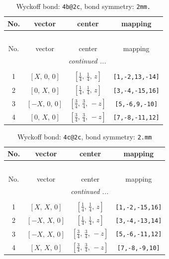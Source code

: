 \documentclass[fleqn,8pt]{jsarticle}
\begin{document}
\begin{longtable}{cccc}
\caption{Wyckoff bond: {\tt 4b@2c}, bond symmetry: {\tt 2mm.}}
 \\
 \hline \hline
No. & vector & center & mapping \\ \hline \endfirsthead

\multicolumn{3}{l}{\tablename\ \thetable{}} \\
 \hline \hline
No. & vector & center & mapping \\ \hline \endhead

 \hline \hline
\multicolumn{3}{r}{\footnotesize\it continued ...} \\ \endfoot

 \hline \hline
\multicolumn{3}{r}{} \\ \endlastfoot

1 & $\left[ X,\, 0,\, 0 \right]$ & $\left[ \frac{1}{4},\, \frac{1}{4},\, z \right]$ & {\tt [1,-2,13,-14]} \\ \hline
2 & $\left[ 0,\, X,\, 0 \right]$ & $\left[ \frac{1}{4},\, \frac{1}{4},\, z \right]$ & {\tt [3,-4,-15,16]} \\ \hline
3 & $\left[ - X,\, 0,\, 0 \right]$ & $\left[ \frac{3}{4},\, \frac{3}{4},\, - z \right]$ & {\tt [5,-6,9,-10]} \\ \hline
4 & $\left[ 0,\, X,\, 0 \right]$ & $\left[ \frac{3}{4},\, \frac{3}{4},\, - z \right]$ & {\tt [7,-8,-11,12]} \\
\end{longtable}
\renewcommand{\arraystretch}{1.2}
\begin{longtable}{cccc}
\caption{Wyckoff bond: {\tt 4c@2c}, bond symmetry: {\tt 2.mm}}
 \\
 \hline \hline
No. & vector & center & mapping \\ \hline \endfirsthead

\multicolumn{3}{l}{\tablename\ \thetable{}} \\
 \hline \hline
No. & vector & center & mapping \\ \hline \endhead

 \hline \hline
\multicolumn{3}{r}{\footnotesize\it continued ...} \\ \endfoot

 \hline \hline
\multicolumn{3}{r}{} \\ \endlastfoot

1 & $\left[ X,\, X,\, 0 \right]$ & $\left[ \frac{1}{4},\, \frac{1}{4},\, z \right]$ & {\tt [1,-2,-15,16]} \\ \hline
2 & $\left[ - X,\, X,\, 0 \right]$ & $\left[ \frac{1}{4},\, \frac{1}{4},\, z \right]$ & {\tt [3,-4,-13,14]} \\ \hline
3 & $\left[ - X,\, X,\, 0 \right]$ & $\left[ \frac{3}{4},\, \frac{3}{4},\, - z \right]$ & {\tt [5,-6,-11,12]} \\ \hline
4 & $\left[ X,\, X,\, 0 \right]$ & $\left[ \frac{3}{4},\, \frac{3}{4},\, - z \right]$ & {\tt [7,-8,-9,10]} \\
\end{longtable}
\end{document}
